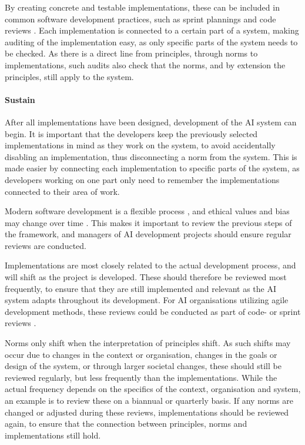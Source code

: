 By creating concrete and testable implementations, these can be included in common software development practices, such as sprint plannings and code reviews \parencite{Dybå_2008_agile}. Each implementation is connected to a certain part of a system, making auditing of the implementation easy, as only specific parts of the system needs to be checked. As there is a direct line from principles, through norms to implementations, such audits also check that the norms, and by extension the principles, still apply to the system.


\paragraph{Sustain}
After all implementations have been designed, development of the AI system can begin. It is important that the developers keep the previously selected implementations in mind as they work on the system, to avoid accidentally disabling an implementation, thus disconnecting a norm from the system. This is made easier by connecting each implementation to specific parts of the system, as developers working on one part only need to remember the implementations connected to their area of work.

Modern software development is a flexible process \parencite{Dybå_2008_agile}, and ethical values and bias may change over time \parencite{Nauck_2019}. This makes it important to review the previous steps of the framework, and managers of AI development projects should ensure regular reviews are conducted.

Implementations are most closely related to the actual development process, and will shift as the project is developed. These should therefore be reviewed most frequently, to ensure that they are still implemented and relevant as the AI system adapts throughout its development. For AI organisations utilizing agile development methods, these reviews could be conducted as part of code- or sprint reviews \parencite{Dybå_2008_agile}.

Norms only shift when the interpretation of principles shift. As such shifts may occur due to changes in the context or organisation, changes in the goals or design of the system, or through larger societal changes, these should still be reviewed regularly, but less frequently than the implementations. While the actual frequency depends on the specifics of the context, organisation and system, an example is to review these on a biannual or quarterly basis. If any norms are changed or adjusted during these reviews, implementations should be reviewed again, to ensure that the connection between principles, norms and implementations still hold.

